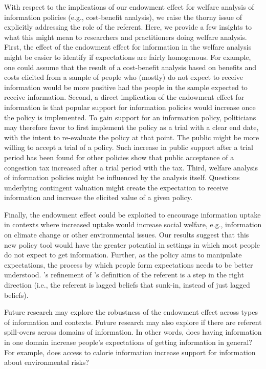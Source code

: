With respect to the implications of our endowment effect for welfare analysis of information policies (e.g., cost-benefit analysis), we raise the thorny issue of explicitly addressing the role of the referent.  Here, we provide a few insights to what this might mean to researchers and practitioners doing welfare analysis. First, the effect of the endowment effect for information in the welfare analysis might be easier to identify if expectations are fairly homogenous. For example, one could assume that the result of a cost-benefit analysis based on benefits and costs elicited from a sample of people who (mostly) do not expect to receive information would be more positive had the people in the sample expected to receive information.  Second, a direct implication of the endowment effect for information is that popular support for information policies would increase once the policy is implemented. To gain support for an information policy, politicians may therefore favor to first implement the policy as a trial with a clear end date, with the intent to re-evaluate the policy at that point. The public might be more willing to accept a trial of a policy. Such increase in public support after a trial period has been found for other policies\textemdash \citet{cherryImpactTrialRuns2014} show that public acceptance of a congestion tax increased after a trial period with the tax. Third, welfare analysis of information policies might be influenced by the analysis itself. Questions underlying contingent valuation might create the expectation to receive information and increase the elicited value of a given policy.

Finally, the endowment effect could be exploited to encourage information uptake in contexts where increased uptake would increase social welfare, e.g., information on climate change or other environmental issues. Our results suggest that this new policy tool would have the greater potential in settings in which most people do not expect to get information.  Further, as the policy aims to manipulate expectations, the process by which people form expectations needs to be better understood. \citet{heffetzAreReferencePoints2018}’s refinement of \citet{koszegiModelReferenceDependentPreferences2006}’s definition of the referent is a step in the right direction (i.e., the referent is lagged beliefs that sunk-in, instead of just lagged beliefs).

Future research may explore the robustness of the endowment effect across types of information and contexts. Future research may also explore if there are referent spill-overs across domains of information. In other words, does having information in one domain increase people’s expectations of getting information in general? For example, does access to calorie information increase support for information about environmental risks?

